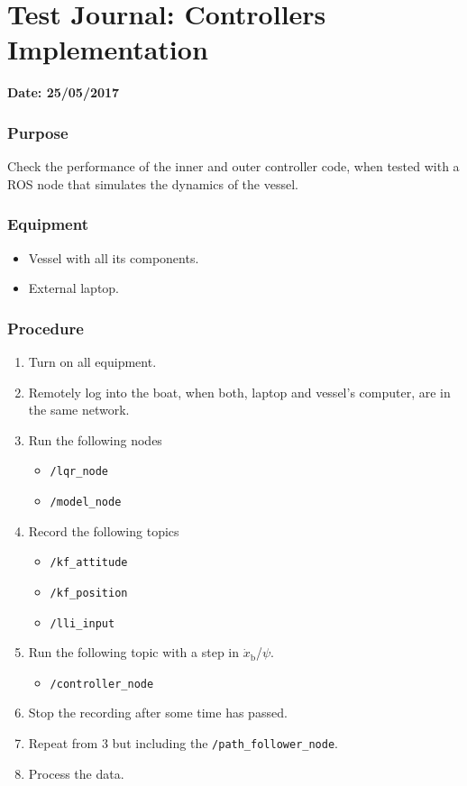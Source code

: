 \chapter{Test Journal: Controllers Implementation} \label{app:ModelNode}

\textbf{Date: 25/05/2017}

\subsection*{Purpose}
Check the performance of the inner and outer controller code, when tested with a ROS node that simulates the dynamics of the vessel.

\subsection*{Equipment}
\begin{itemize}
    \item Vessel with all its components. 
    \item External laptop.
\end{itemize}

\subsection*{Procedure}
\begin{enumerate}
    \item Turn on all equipment.
    \item Remotely log into the boat, when both, laptop and vessel's computer, are in the same network.
    \item Run the following nodes
    \begin{itemize}
        \item \lstinline[style=cinline]{/lqr_node}  
        \item \lstinline[style=cinline]{/model_node}
    \end{itemize}
    \item Record the following topics
    \begin{itemize}
        \item \lstinline[style=cinline]{/kf_attitude}
        \item \lstinline[style=cinline]{/kf_position}   
        \item \lstinline[style=cinline]{/lli_input}  
    \end{itemize}
    \item Run the following topic with a step in $\dot{x}_\mathrm{b}$/$\psi$.
    \begin{itemize}
        \item \lstinline[style=cinline]{/controller_node}
    \end{itemize}
    \item Stop the recording after some time has passed.
    \item Repeat from 3 but including the \lstinline[style=cinline]{/path_follower_node}.
    \item Process the data.
\end{enumerate}

